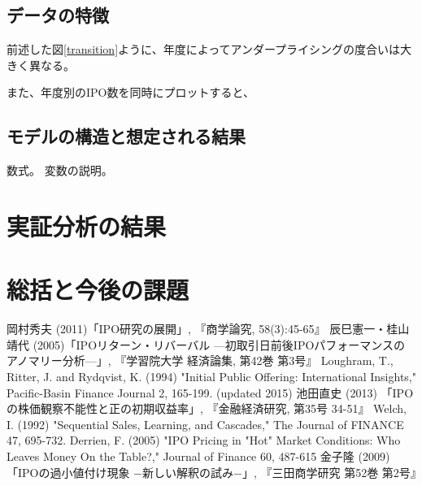 \documentclass{jsarticle}
\begin{document}
\subsection{データの特徴}
前述した図\ref{transition}ように、年度によってアンダープライシングの度合いは大きく異なる。\par
また、年度別のIPO数を同時にプロットすると、
\subsection{モデルの構造と想定される結果}
数式。
変数の説明。

\section{実証分析の結果}
\section{総括と今後の課題}

\newpage


\begin{thebibliography}{99}
 岡村秀夫 (2011)「IPO研究の展開」, 『商学論究, 58(3):45-65』
 辰巳憲一・桂山靖代 (2005)「IPOリターン・リバーバル —初取引日前後IPOパフォーマンスのアノマリー分析—」, 『学習院大学 経済論集, 第42巻 第3号』
 Loughram, T., Ritter, J. and Rydqvist, K. (1994) "Initial Public Offering: International Insights," Pacific-Basin Finance Journal 2, 165-199. (updated 2015)
 池田直史 (2013) 「IPOの株価観察不能性と正の初期収益率」, 『金融経済研究, 第35号 34-51』
 Welch, I. (1992) "Sequential Sales, Learning, and Cascades," The Journal of FINANCE 47, 695-732.
 Derrien, F. (2005) "IPO Pricing in "Hot" Market Conditions: Who Leaves Money On the Table?," Journal of Finance 60, 487-615
 金子隆 (2009) 「IPOの過小値付け現象 −新しい解釈の試み−」, 『三田商学研究 第52巻 第2号』
\end{thebibliography}
\end{document}
